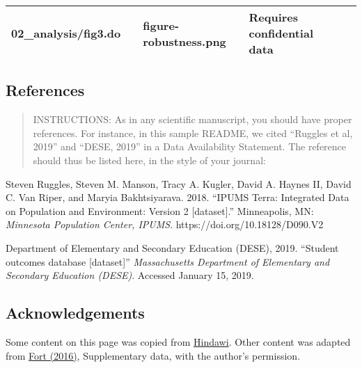 \documentclass[
]{article}
\begin{document}
\begin{longtable}[]{@{}lllll@{}}
\begin{minipage}[t]{0.18\columnwidth}
02\_analysis/fig3.do\strut
\end{minipage} & \begin{minipage}[t]{0.09\columnwidth}\raggedright
\strut
\end{minipage} & \begin{minipage}[t]{0.23\columnwidth}\raggedright
figure-robustness.png\strut
\end{minipage} & \begin{minipage}[t]{0.23\columnwidth}\raggedright
Requires confidential data\strut
\end{minipage}\tabularnewline
\bottomrule
\end{longtable}

\hypertarget{references}{%
\subsection{References}\label{references}}

\begin{quote}
INSTRUCTIONS: As in any scientific manuscript, you should have proper
references. For instance, in this sample README, we cited ``Ruggles et
al, 2019'' and ``DESE, 2019'' in a Data Availability Statement. The
reference should thus be listed here, in the style of your journal:
\end{quote}

Steven Ruggles, Steven M. Manson, Tracy A. Kugler, David A. Haynes II,
David C. Van Riper, and Maryia Bakhtsiyarava. 2018. ``IPUMS Terra:
Integrated Data on Population and Environment: Version 2
{[}dataset{]}.'' Minneapolis, MN: \emph{Minnesota Population Center,
IPUMS}. https://doi.org/10.18128/D090.V2

Department of Elementary and Secondary Education (DESE), 2019. ``Student
outcomes database {[}dataset{]}'' \emph{Massachusetts Department of
Elementary and Secondary Education (DESE)}. Accessed January 15, 2019.

\hypertarget{acknowledgements}{%
\subsection{Acknowledgements}\label{acknowledgements}}

Some content on this page was copied from
\href{https://www.hindawi.com/research.data/\#statement.templates}{Hindawi}.
Other content was adapted from
\href{https://doi.org/10.1093/restud/rdw057}{Fort (2016)}, Supplementary
data, with the author's permission.
\end{document}
